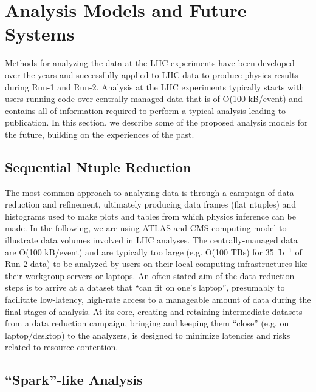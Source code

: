\documentclass[12pt,a4paper]{article}
\begin{document}
\section{Analysis Models and Future Systems}\label{sec:models}

Methods for analyzing the data at the LHC experiments have been developed over the years and successfully applied to LHC data to produce physics results during Run-1 and Run-2. Analysis at the LHC experiments typically starts with users running code over centrally-managed data that is of O(100 kB/event) and contains all of information required to perform a typical analysis leading to publication. In this section, we describe some of the proposed analysis models for the future, building on the experiences of the past.

\subsection{Sequential Ntuple Reduction}

The most common approach to analyzing data is through a campaign of data reduction and refinement, ultimately producing data frames (flat ntuples) and histograms used to make plots and tables from which physics inference can be made. In the following, we are using ATLAS and CMS computing model to illustrate data volumes involved in LHC analyses. The centrally-managed data are O(100 kB/event) and are typically too large (e.g. O(100 TBs) for 35 fb$^{-1}$ of Run-2 data) to be analyzed by users on their local computing infrastructures like their workgroup servers or laptops. An often stated aim of the data reduction steps is to arrive at a dataset that ``can fit on one's laptop'', presumably to facilitate low-latency, high-rate access to a manageable amount of data during the final stages of analysis.  At its core, creating and retaining intermediate datasets from a data reduction campaign, bringing and keeping them ``close'' (e.g. on laptop/desktop) to the analyzers, is designed to minimize latencies and risks related to resource contention.

\subsection{``Spark''-like Analysis}
\end{document}
